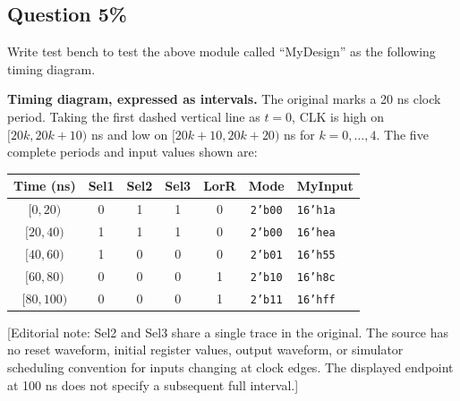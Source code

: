 \documentclass[11pt,a4paper]{article}
\newcommand{\question}[2]{\subsection*{Question #1\hfill\normalfont #2}}
\begin{document}
\question{5}{15\%}
Write test bench to test the above module called ``MyDesign'' as the following
timing diagram.

\textbf{Timing diagram, expressed as intervals.} The original marks a
20 ns clock period. Taking the first dashed vertical line as $t=0$, CLK is
high on $[20k,20k+10)$ ns and low on $[20k+10,20k+20)$ ns for $k=0,\ldots,4$.
The five complete periods and input values shown are:
\begin{center}
\small
\begin{tabular}{c c c c c c l}
\toprule
Time (ns) & Sel1 & Sel2 & Sel3 & LorR & Mode & MyInput\\
\midrule
$[0,20)$   & 0 & 1 & 1 & 0 & \texttt{2'b00} & \texttt{16'h1a}\\
$[20,40)$  & 1 & 1 & 1 & 0 & \texttt{2'b00} & \texttt{16'hea}\\
$[40,60)$  & 1 & 0 & 0 & 0 & \texttt{2'b01} & \texttt{16'h55}\\
$[60,80)$  & 0 & 0 & 0 & 1 & \texttt{2'b10} & \texttt{16'h8c}\\
$[80,100)$ & 0 & 0 & 0 & 1 & \texttt{2'b11} & \texttt{16'hff}\\
\bottomrule
\end{tabular}
\end{center}
{\small [Editorial note: Sel2 and Sel3 share a single trace in the original.
The source has no reset waveform, initial register values, output waveform,
or simulator scheduling convention for inputs changing at clock edges.
The displayed endpoint at 100 ns does not specify a subsequent full interval.]}
\end{document}
